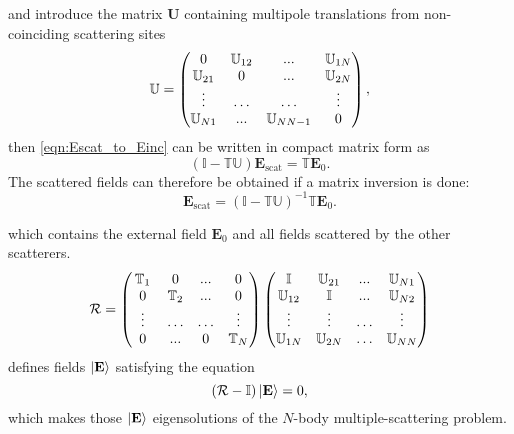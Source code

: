 and introduce the matrix $\mathbf{U}$ containing multipole translations from non-coinciding scattering sites
\begin{equation}
\mathbb{U} = 
\left(
\begin{matrix}
0 & \mathbb{U}_{12} & ... & \mathbb{U}_{1 N} \\
\mathbb{U}_{21} & 0 & ... & \mathbb{U}_{2 N} \\
\vdotswithin{\ldots} & \ldots &  \ldots & \vdotswithin{\ldots} \\
\mathbb{U}_{N 1} & ... & \mathbb{U}_{N N-1} & 0\\
\end{matrix}
\right),
\end{equation}
then \cref{eqn:Escat_to_Einc} can be written in compact matrix form as
\begin{equation}
\left(\mathbb{I}-\mathbb{T} \mathbb{U}\right)\mathbf{E}_\mathrm{scat} = 
\mathbb{T} \mathbf{E}_0.
\label{eqn:matrix_form}
\end{equation}
The scattered fields can therefore be obtained if a matrix inversion is done:
\begin{equation}
\mathbf{E}_\mathrm{scat} = \left(\mathbb{I}-\mathbb{T} \mathbb{U}\right)^{-1}
\mathbb{T} \mathbf{E}_0.
\label{eqn:matrix_form}
\end{equation}


which contains the external field $\mathbf{E}_0$ and all fields scattered by the other scatterers.
\begin{equation}
\mathcal{R} = 
\left(
\begin{matrix}
\mathbb{T}_1 & 0 & ... & 0 \\
0 & \mathbb{T}_2 & ... & 0 \\
\vdotswithin{\ldots} & \ldots &  \ldots & \vdotswithin{\ldots} \\
0 & ... & 0 & \mathbb{T}_N\\
\end{matrix}
\right)
\left(\begin{matrix}
\mathbb{I} & \mathbb{U}_{21} & ... & \mathbb{U}_{N 1} \\
\mathbb{U}_{12} & \mathbb{I} & ... & \mathbb{U}_{N 2} \\
\vdotswithin{\mathbb{U}_{13}} & \vdotswithin{\ldots} & \ldots & \vdotswithin{\ldots} \\
\mathbb{U}_{1 N} & \mathbb{U}_{2 N} & \ldots & \mathbb{U}_{N N} 
\end{matrix}\right)
\end{equation}
defines fields $\ket{\mathbf{E}}$ satisfying the equation
\begin{equation}
\left(\mathcal{R}-\mathbb{I}\right)\ket{\mathbf{E}} = 0,
\end{equation}
which makes those $\ket{\mathbf{E}}$ eigensolutions of the $N$-body multiple-scattering problem.